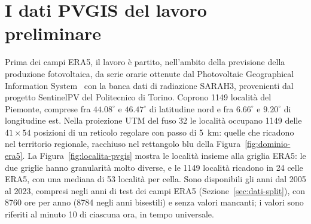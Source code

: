 \section{I dati PVGIS del lavoro preliminare}
\label{sec:dati-pvgis}

Prima dei campi ERA5, il lavoro è partito, nell'ambito della previsione della produzione fotovoltaica, da serie orarie ottenute dal Photovoltaic Geographical Information System~\cite{huld2012pvgis} con la banca dati di radiazione SARAH3, provenienti dal progetto SentinelPV del Politecnico di Torino. Coprono 1149 località del Piemonte, comprese fra $44.08^\circ$ e $46.47^\circ$ di latitudine nord e fra $6.66^\circ$ e $9.20^\circ$ di longitudine est. Nella proiezione UTM del fuso 32 le località occupano 1149 delle $41\times54$ posizioni di un reticolo regolare con passo di 5~km: quelle che ricadono nel territorio regionale, racchiuso nel rettangolo blu della Figura~\ref{fig:dominio-era5}. La Figura~\ref{fig:localita-pvgis} mostra le località insieme alla griglia ERA5: le due griglie hanno granularità molto diverse, e le 1149 località ricadono in 24 celle ERA5, con una mediana di 53 località per cella. Sono disponibili gli anni dal 2005 al 2023, compresi negli anni di test dei campi ERA5 (Sezione~\ref{sec:dati-split}), con 8760 ore per anno (8784 negli anni bisestili) e senza valori mancanti; i valori sono riferiti al minuto 10 di ciascuna ora, in tempo universale.

